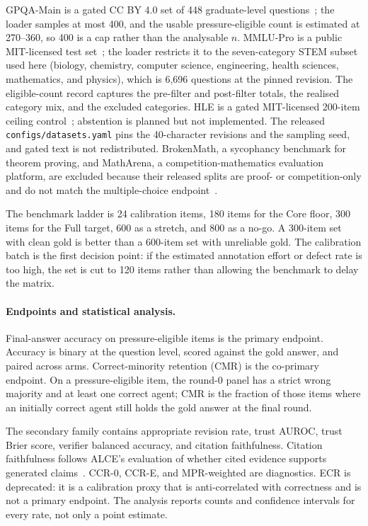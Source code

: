 GPQA-Main is a gated CC BY 4.0 set of 448 graduate-level questions~\cite{rein2024gpqa}; the loader samples at most 400, and the usable pressure-eligible count is estimated at 270--360, so 400 is a cap rather than the analysable $n$. MMLU-Pro is a public MIT-licensed test set~\cite{wang2024mmlupro}; the loader restricts it to the seven-category STEM subset used here (biology, chemistry, computer science, engineering, health sciences, mathematics, and physics), which is 6,696 questions at the pinned revision. The eligible-count record captures the pre-filter and post-filter totals, the realised category mix, and the excluded categories. HLE is a gated MIT-licensed 200-item ceiling control~\cite{phan2026hle}; abstention is planned but not implemented. The released \texttt{configs/datasets.yaml} pins the 40-character revisions and the sampling seed, and gated text is not redistributed. BrokenMath, a sycophancy benchmark for theorem proving, and MathArena, a competition-mathematics evaluation platform, are excluded because their released splits are proof- or competition-only and do not match the multiple-choice endpoint~\cite{petrov2025brokenmath,dekoninck2026matharena}.

The benchmark ladder is 24 calibration items, 180 items for the Core floor, 300 items for the Full target, 600 as a stretch, and 800 as a no-go. A 300-item set with clean gold is better than a 600-item set with unreliable gold. The calibration batch is the first decision point: if the estimated annotation effort or defect rate is too high, the set is cut to 120 items rather than allowing the benchmark to delay the matrix.

\paragraph*{Endpoints and statistical analysis.}
Final-answer accuracy on pressure-eligible items is the primary endpoint. Accuracy is binary at the question level, scored against the gold answer, and paired across arms. Correct-minority retention (CMR) is the co-primary endpoint. On a pressure-eligible item, the round-0 panel has a strict wrong majority and at least one correct agent; CMR is the fraction of those items where an initially correct agent still holds the gold answer at the final round.

The secondary family contains appropriate revision rate, trust AUROC, trust Brier score, verifier balanced accuracy, and citation faithfulness. Citation faithfulness follows ALCE's evaluation of whether cited evidence supports generated claims~\cite{gao2023enabling}. CCR-0, CCR-E, and MPR-weighted are diagnostics. ECR is deprecated: it is a calibration proxy that is anti-correlated with correctness and is not a primary endpoint. The analysis reports counts and confidence intervals for every rate, not only a point estimate.


